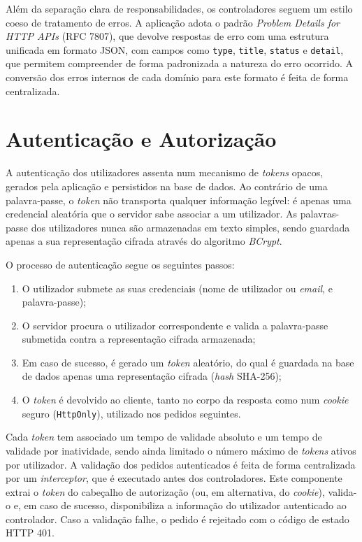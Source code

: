 Além da separação clara de responsabilidades, os controladores seguem um 
estilo coeso de tratamento de erros. A aplicação adota o padrão 
\textit{Problem Details for HTTP APIs} (RFC 7807), que devolve 
respostas de erro com uma estrutura unificada em formato JSON, com campos como 
\texttt{type}, \texttt{title}, \texttt{status} e \texttt{detail}, que permitem 
compreender de forma padronizada a natureza do erro ocorrido. A conversão dos 
erros internos de cada domínio para este formato é feita de forma centralizada.

\section{Autenticação e Autorização}
\label{sec:autenticacao}

A autenticação dos utilizadores assenta num mecanismo de \textit{tokens} 
opacos, gerados pela aplicação e persistidos na base de dados. Ao contrário de 
uma palavra-passe, o \textit{token} não transporta qualquer informação 
legível: é apenas uma credencial aleatória que o servidor sabe associar a um 
utilizador. As palavras-passe dos utilizadores nunca são armazenadas em texto 
simples, sendo guardada apenas a sua representação cifrada através do algoritmo 
\textit{BCrypt}.

O processo de autenticação segue os seguintes passos:

\begin{enumerate}
    \item O utilizador submete as suas credenciais (nome de utilizador ou 
    \textit{email}, e palavra-passe);
    \item O servidor procura o utilizador correspondente e valida a 
    palavra-passe submetida contra a representação cifrada armazenada;
    \item Em caso de sucesso, é gerado um \textit{token} aleatório, do qual é 
    guardada na base de dados apenas uma representação cifrada 
    (\textit{hash} SHA-256);
    \item O \textit{token} é devolvido ao cliente, tanto no corpo da resposta 
    como num \textit{cookie} seguro (\texttt{HttpOnly}), utilizado nos pedidos 
    seguintes.
\end{enumerate}

Cada \textit{token} tem associado um tempo de validade absoluto e um tempo de 
validade por inatividade, sendo ainda limitado o número máximo de 
\textit{tokens} ativos por utilizador. A validação dos pedidos autenticados é 
feita de forma centralizada por um \textit{interceptor}, que é executado antes 
dos controladores. Este componente extrai o \textit{token} do cabeçalho de 
autorização (ou, em alternativa, do \textit{cookie}), valida-o e, em caso de 
sucesso, disponibiliza a informação do utilizador autenticado ao controlador. 
Caso a validação falhe, o pedido é rejeitado com o código de estado HTTP 401.

